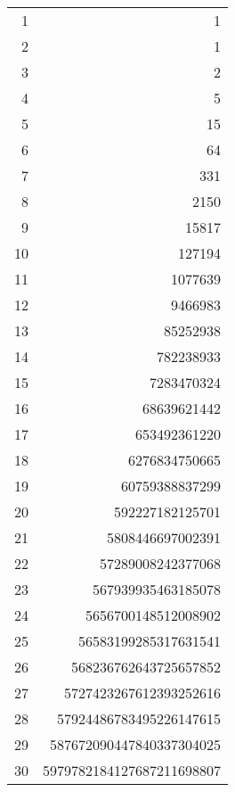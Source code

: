 \documentclass[distribution,draft]{brandiss} %
\numberwithin{section}{chapter}
\numberwithin{figure}{chapter}
\begin{document}
\begin{table}[htb]
{\begin{tabular}{r | r}
      1 & 1 \\
      2 & 1 \\
      3 & 2 \\
      4 & 5 \\
      5 & 15 \\
      6 & 64 \\
      7 & 331 \\
      8 & 2150 \\
      9 & 15817 \\
      10 & 127194 \\
      11 & 1077639 \\
      12 & 9466983 \\
      13 & 85252938 \\
      14 & 782238933 \\
      15 & 7283470324 \\
      16 & 68639621442 \\
      17 & 653492361220 \\
      18 & 6276834750665 \\
      19 & 60759388837299 \\
      20 & 592227182125701 \\
      21 & 5808446697002391 \\
      22 & 57289008242377068 \\
      23 & 567939935463185078 \\
      24 & 5656700148512008902 \\
      25 & 56583199285317631541 \\
      26 & 568236762643725657852 \\
      27 & 5727423267612393252616 \\
      28 & 57924486783495226147615 \\
      29 & 587672090447840337304025 \\
      30 & 5979782184127687211698807
    \end{tabular}
  }
\end{table}
\end{document}
